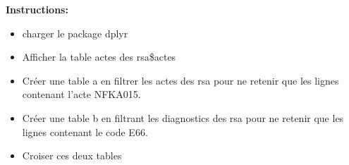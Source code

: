 \documentclass[
]{book}
\begin{document}
\textbf{Instructions:}

\begin{itemize}
\item
  charger le package dplyr
\item
  Afficher la table actes des rsa\$actes
\item
  Créer une table a en filtrer les actes des rsa pour ne retenir que les lignes contenant l'acte NFKA015.
\item
  Créer une table b en filtrant les diagnostics des rsa pour ne retenir que les lignes contenant le code E66.
\item
  Croiser ces deux tables
\end{itemize}
\end{document}
